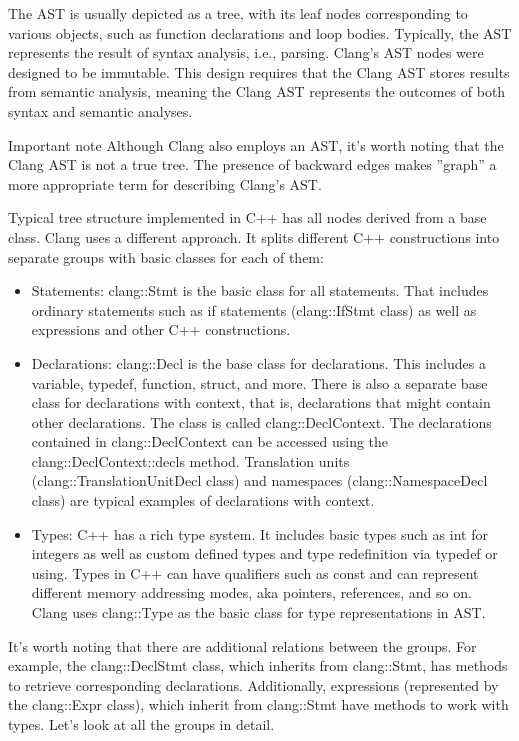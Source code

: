 The AST is usually depicted as a tree, with its leaf nodes corresponding to various objects, such as function declarations and loop bodies. Typically, the AST represents the result of syntax analysis, i.e., parsing. Clang's AST nodes were designed to be immutable. This design requires that the Clang AST stores results from semantic analysis, meaning the Clang AST represents the outcomes of both syntax and semantic analyses.

\begin{myNotic}{Important note}
Although Clang also employs an AST, it's worth noting that the Clang AST is not a true tree. The presence of backward edges makes ”graph” a more appropriate term for describing Clang's AST.
\end{myNotic}

Typical tree structure implemented in C++ has all nodes derived from a base class. Clang uses a different approach. It splits different C++ constructions into separate groups with basic classes for each of them:

\begin{itemize}
\item
Statements: clang::Stmt is the basic class for all statements. That includes ordinary statements such as if statements (clang::IfStmt class) as well as expressions and other C++ constructions.

\item
Declarations: clang::Decl is the base class for declarations. This includes a variable, typedef, function, struct, and more. There is also a separate base class for declarations with context, that is, declarations that might contain other declarations. The class is called clang::DeclContext. The declarations contained in clang::DeclContext can be accessed using the clang::DeclContext::decls method. Translation units (clang::TranslationUnitDecl class) and namespaces (clang::NamespaceDecl class) are typical examples of declarations with context.

\item
Types: C++ has a rich type system. It includes basic types such as int for integers as well as custom defined types and type redefinition via typedef or using. Types in C++ can have qualifiers such as const and can represent different memory addressing modes, aka pointers, references, and so on. Clang uses clang::Type as the basic class for type representations in AST.
\end{itemize}

It's worth noting that there are additional relations between the groups. For example, the clang::DeclStmt class, which inherits from clang::Stmt, has methods to retrieve corresponding declarations. Additionally, expressions (represented by the clang::Expr class), which inherit from clang::Stmt have methods to work with types. Let's look at all the groups in detail.

